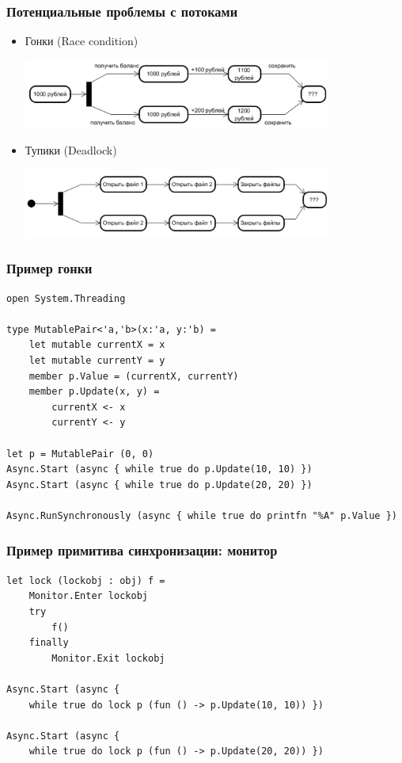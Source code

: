 \documentclass[xetex,mathserif,serif]{beamer}
\begin{document}
	\begin{frame}
		\frametitle{Потенциальные проблемы с потоками}
		\begin{itemize}
			\item Гонки (Race condition)
				\begin{center}
					\includegraphics[width=0.8\textwidth]{raceCondition.png}
				\end{center}
				\vspace{1cm}
			\item Тупики (Deadlock)
				\begin{center}
					\includegraphics[width=0.8\textwidth]{deadlock.png}
				\end{center}
		\end{itemize}
	\end{frame}

	\begin{frame}[fragile]
		\frametitle{Пример гонки}
		\begin{verbatim}
open System.Threading

type MutablePair<'a,'b>(x:'a, y:'b) =
    let mutable currentX = x
    let mutable currentY = y
    member p.Value = (currentX, currentY)
    member p.Update(x, y) =
        currentX <- x
        currentY <- y

let p = MutablePair (0, 0)
Async.Start (async { while true do p.Update(10, 10) })
Async.Start (async { while true do p.Update(20, 20) })

Async.RunSynchronously (async { while true do printfn "%A" p.Value })
		\end{verbatim}
\end{frame}

	\begin{frame}[fragile]
		\frametitle{Пример примитива синхронизации: монитор}
		\begin{verbatim}
let lock (lockobj : obj) f =
    Monitor.Enter lockobj
    try
        f()
    finally
        Monitor.Exit lockobj

Async.Start (async { 
    while true do lock p (fun () -> p.Update(10, 10)) })

Async.Start (async { 
    while true do lock p (fun () -> p.Update(20, 20)) })
		\end{verbatim}
\end{frame}
\end{document}
